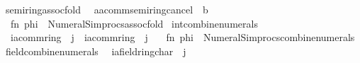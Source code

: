 \begin{isabellebody}
\isanewline
{}\isamarkupfalse%
\ semiring{\isacharunderscore}{\kern0pt}assoc{\isacharunderscore}{\kern0pt}fold\isanewline
\ \ {\isacharparenleft}{\kern0pt}{\isachardoublequoteopen}{\isacharparenleft}{\kern0pt}a{\isacharcolon}{\kern0pt}{\isacharcolon}{\kern0pt}{\isacharprime}{\kern0pt}a{\isacharcolon}{\kern0pt}{\isacharcolon}{\kern0pt}comm{\isacharunderscore}{\kern0pt}semiring{\isacharunderscore}{\kern0pt}{}{\isacharunderscore}{\kern0pt}cancel{\isacharparenright}{\kern0pt}\ {\isacharasterisk}{\kern0pt}\ b{\isachardoublequoteclose}{\isacharparenright}{\kern0pt}\ {\isacharequal}{\kern0pt}\isanewline
\ \ {\isacartoucheopen}fn\ phi\ {\isacharequal}{\kern0pt}{\isachargreater}{\kern0pt}\ Numeral{\isacharunderscore}{\kern0pt}Simprocs{\isachardot}{\kern0pt}assoc{\isacharunderscore}{\kern0pt}fold{\isacartoucheclose}\isanewline
\isanewline
\isanewline
{}\isamarkupfalse%
\ int{\isacharunderscore}{\kern0pt}combine{\isacharunderscore}{\kern0pt}numerals\isanewline
\ \ {\isacharparenleft}{\kern0pt}{\isachardoublequoteopen}{\isacharparenleft}{\kern0pt}i{\isacharcolon}{\kern0pt}{\isacharcolon}{\kern0pt}{\isacharprime}{\kern0pt}a{\isacharcolon}{\kern0pt}{\isacharcolon}{\kern0pt}comm{\isacharunderscore}{\kern0pt}ring{\isacharunderscore}{\kern0pt}{}{\isacharparenright}{\kern0pt}\ {\isacharplus}{\kern0pt}\ j{\isachardoublequoteclose}\ {\isacharbar}{\kern0pt}\ {\isachardoublequoteopen}{\isacharparenleft}{\kern0pt}i{\isacharcolon}{\kern0pt}{\isacharcolon}{\kern0pt}{\isacharprime}{\kern0pt}a{\isacharcolon}{\kern0pt}{\isacharcolon}{\kern0pt}comm{\isacharunderscore}{\kern0pt}ring{\isacharunderscore}{\kern0pt}{}{\isacharparenright}{\kern0pt}\ {\isacharminus}{\kern0pt}\ j{\isachardoublequoteclose}{\isacharparenright}{\kern0pt}\ {\isacharequal}{\kern0pt}\isanewline
\ \ {\isacartoucheopen}fn\ phi\ {\isacharequal}{\kern0pt}{\isachargreater}{\kern0pt}\ Numeral{\isacharunderscore}{\kern0pt}Simprocs{\isachardot}{\kern0pt}combine{\isacharunderscore}{\kern0pt}numerals{\isacartoucheclose}\isanewline
\isanewline
{}\isamarkupfalse%
\ field{\isacharunderscore}{\kern0pt}combine{\isacharunderscore}{\kern0pt}numerals\isanewline
\ \ {\isacharparenleft}{\kern0pt}{\isachardoublequoteopen}{\isacharparenleft}{\kern0pt}i{\isacharcolon}{\kern0pt}{\isacharcolon}{\kern0pt}{\isacharprime}{\kern0pt}a{\isacharcolon}{\kern0pt}{\isacharcolon}{\kern0pt}{\isacharbraceleft}{\kern0pt}field{\isacharcomma}{\kern0pt}ring{\isacharunderscore}{\kern0pt}char{\isacharunderscore}{\kern0pt}{}{\isacharbraceright}{\kern0pt}{\isacharparenright}{\kern0pt}\ {\isacharplus}{\kern0pt}\ j{\isachardoublequoteclose}\isanewline

\end{isabellebody}
